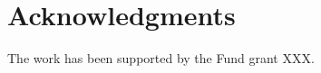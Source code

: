 \documentclass{zapiski}
\begin{document}
\section*{Acknowledgments}
The work has been supported by the Fund grant XXX.

% 
% 

\providecommand{\bysame}{\leavevmode\hbox to3em{\hrulefill}\thinspace}
\providecommand{\MR}{\relax\ifhmode\unskip\space\fi MR }
\providecommand{\MRhref}[2]{
  \href{http://www.ams.org/mathscinet-getitem?mr=#1}{#2}
}
\begin{thebibliography}{10}
\end{thebibliography}
\end{document}
